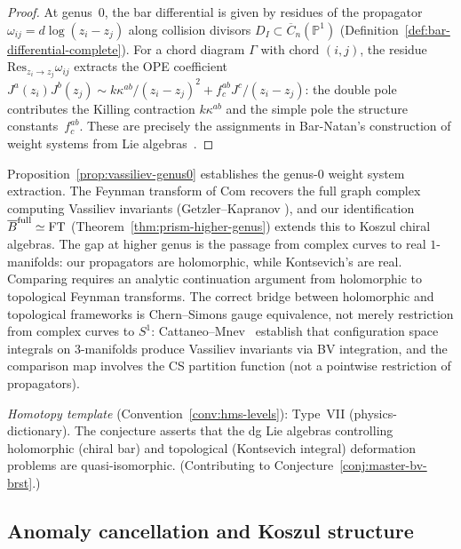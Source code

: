 \begin{proof}
At genus~$0$, the bar differential is given by residues of
the propagator $\omega_{ij} = d\log(z_i - z_j)$ along collision
divisors $D_I \subset \overline{C}_n(\mathbb{P}^1)$
(Definition~\ref{def:bar-differential-complete}).  For a chord
diagram $\Gamma$ with chord $(i,j)$, the residue
$\mathrm{Res}_{z_i \to z_j} \omega_{ij}$ extracts the
OPE coefficient $J^a(z_i) J^b(z_j) \sim k \kappa^{ab}/(z_i-z_j)^2
+ f^{ab}_c J^c/(z_i-z_j)$: the double pole contributes the
Killing contraction $k\kappa^{ab}$ and the simple pole the
structure constants~$f^{ab}_c$.  These are precisely the
assignments in Bar-Natan's construction of weight systems from
Lie algebras~\cite{BarNatan95}.
\end{proof}

\begin{remark}[Scope]\label{rem:vassiliev-scope}
Proposition~\ref{prop:vassiliev-genus0} establishes the genus-$0$
weight system extraction.  The Feynman transform of $\mathrm{Com}$
recovers the full graph complex computing Vassiliev invariants
(Getzler--Kapranov \cite{GeK98}), and our identification
$\overline{B}^{\mathrm{full}} \simeq \mathrm{FT}$
(Theorem~\ref{thm:prism-higher-genus}) extends this to Koszul
chiral algebras.  The gap at higher genus is the passage from
complex curves to real $1$-manifolds: our propagators are
holomorphic, while Kontsevich's are real.  Comparing requires an
analytic continuation argument from holomorphic to topological
Feynman transforms.
The correct bridge between holomorphic and topological frameworks is Chern--Simons gauge equivalence, not merely restriction from complex curves to $S^1$: Cattaneo--Mnev~\cite{CattaneoMnev10} establish that configuration space integrals on $3$-manifolds produce Vassiliev invariants via BV integration, and the comparison map involves the CS partition function (not a pointwise restriction of propagators).

\emph{Homotopy template} (Convention~\ref{conv:hms-levels}): Type~VII (physics-dictionary).
The conjecture asserts that the dg Lie algebras controlling
holomorphic (chiral bar) and topological (Kontsevich integral)
deformation problems are quasi-isomorphic.
(Contributing to Conjecture~\ref{conj:master-bv-brst}.)
\end{remark}

\subsection{Anomaly cancellation and Koszul structure}
\label{subsec:anomaly-koszul}

